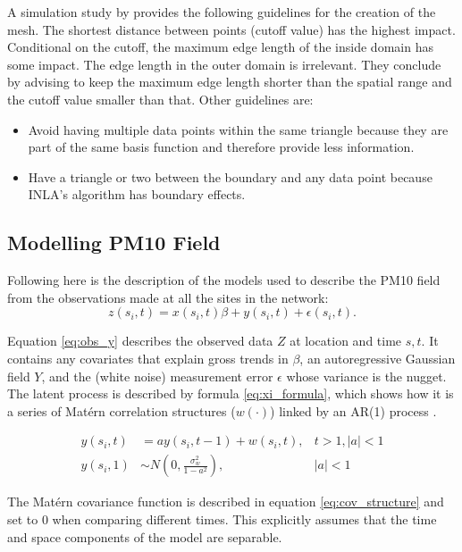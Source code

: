 \documentclass{article}
\begin{document}
A simulation study by \citet{Righetto2020} provides the following guidelines for the creation of the mesh.  The shortest distance between points (cutoff value) has the highest impact.  Conditional on the cutoff, the maximum edge length of the inside domain has some impact.  The edge length in the outer domain is irrelevant.  They conclude by advising to keep the maximum edge length shorter than the spatial range and the cutoff value smaller than that.  Other guidelines are:
\begin{itemize}
    \item Avoid having multiple data points within the same triangle because they are part of the same basis function and therefore provide less information.
    \item Have a triangle or two between the boundary and any data point because \ac{INLA}'s algorithm has boundary effects.
\end{itemize} 






\subsection{Modelling PM10 Field}\label{subsec:modelling PM10}
Following \cite{cameletti2011spatio} here is the description of the models used to describe the \ac{PM10} field from the observations made at all the sites in the network:
\begin{equation} \label{eq:obs_y}
    z(s_i,t) = x(s_i,t)\beta + y(s_i, t) + \epsilon(s_i,t).
\end{equation}

Equation \ref{eq:obs_y} describes the observed data $Z$ at location and time ${s,t}$.  It contains any covariates that explain gross trends in $\beta$, an autoregressive Gaussian field $Y$, and the (white noise) measurement error $\epsilon$ whose variance is the nugget.  The latent process is described by formula \ref{eq:xi_formula}, which shows how it is a series of Mat\'{e}rn correlation structures ($w(\cdot)$) linked by an \ac{AR}(1) process \citep{gomezGitBook, cameletti2011spatio}.

\begin{align} \label{eq:xi_formula}
    y(s_i, t) &= ay(s_i, t-1) + w(s_i,t) , &t>1, |a| < 1 \\
    y (s_i, 1) &\sim N(0, \frac{\sigma_w^{2}}{1-a^2}) , &|a| < 1 \nonumber
\end{align}

The Mat\'{e}rn covariance function is described in equation \ref{eq:cov_structure} and set to 0 when comparing different times.  This explicitly assumes that the time and space components of the model are separable. %
\end{document}
